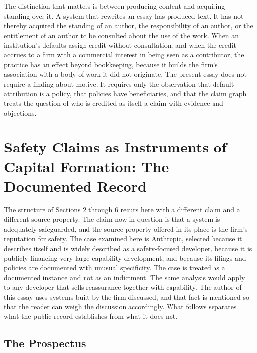\documentclass[12pt]{article}
\theoremstyle{definition}
\theoremstyle{remark}
\begin{document}
The distinction that matters is between producing content and acquiring standing over it. A system that rewrites an essay has produced text. It has not thereby acquired the standing of an author, the responsibility of an author, or the entitlement of an author to be consulted about the use of the work. When an institution's defaults assign credit without consultation, and when the credit accrues to a firm with a commercial interest in being seen as a contributor, the practice has an effect beyond bookkeeping, because it builds the firm's association with a body of work it did not originate. The present essay does not require a finding about motive. It requires only the observation that default attribution is a policy, that policies have beneficiaries, and that the claim graph treats the question of who is credited as itself a claim with evidence and objections.

\section{Safety Claims as Instruments of Capital Formation: The Documented Record}

The structure of Sections 2 through 6 recurs here with a different claim and a different source property. The claim now in question is that a system is adequately safeguarded, and the source property offered in its place is the firm's reputation for safety. The case examined here is Anthropic, selected because it describes itself and is widely described as a safety-focused developer, because it is publicly financing very large capability development, and because its filings and policies are documented with unusual specificity. The case is treated as a documented instance and not as an indictment. The same analysis would apply to any developer that sells reassurance together with capability. The author of this essay uses systems built by the firm discussed, and that fact is mentioned so that the reader can weigh the discussion accordingly. What follows separates what the public record establishes from what it does not.

\subsection{The Prospectus}
\end{document}
